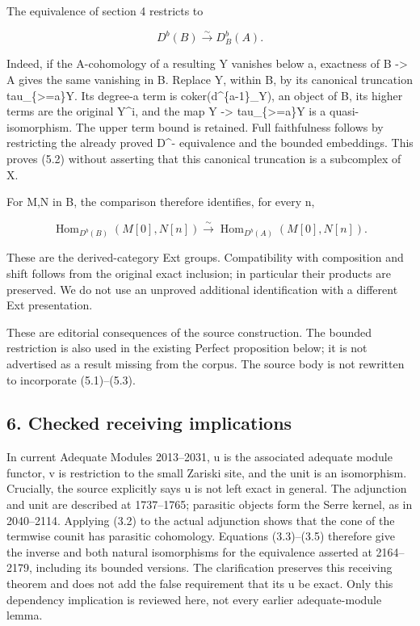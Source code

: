 \documentclass[11pt]{article}
\begin{document}
The equivalence of section 4 restricts to

\[
 D^b(B)\xrightarrow{\sim}D^b_B(A).                      \tag{5.2}
\]

Indeed,\allowbreak{} if the A-cohomology of a resulting Y vanishes below a,\allowbreak{} exactness of B \allowbreak{}-> A gives the same vanishing in B. Replace Y,\allowbreak{} within B,\allowbreak{} by its canonical truncation tau\_\allowbreak{}\{>\allowbreak{}=a\}Y. Its degree-a term is coker(d\textasciicircum{}\{a-1\}\_\allowbreak{}Y)\allowbreak{},\allowbreak{} an object of B,\allowbreak{} its higher terms are the original Y\textasciicircum{}i,\allowbreak{} and the map Y \allowbreak{}-> tau\_\allowbreak{}\{>\allowbreak{}=a\}Y is a quasi-isomorphism. The upper term bound is retained. Full faithfulness follows by restricting the already proved D\^{}- equivalence and the bounded embeddings. This proves (5.2)\allowbreak{} without asserting that this canonical truncation is a subcomplex of X.

For M,\allowbreak{}N in B,\allowbreak{} the comparison therefore identifies,\allowbreak{} for every n,\allowbreak{}

\[
 \operatorname{Hom}_{D^b(B)}(M[0],N[n])
   \xrightarrow{\sim}
 \operatorname{Hom}_{D^b(A)}(M[0],N[n]).                 \tag{5.3}
\]

These are the derived-category Ext groups. Compatibility with composition and shift follows from the original exact inclusion; in particular their products are preserved. We do not use an unproved additional identification with a different Ext presentation.

These are editorial consequences of the source construction. The bounded restriction is also used in the existing Perfect proposition below; it is not advertised as a result missing from the corpus. The source body is not rewritten to incorporate (5.1)\allowbreak{}–\allowbreak{}(5.3)\allowbreak{}.

\subsection{6. Checked receiving implications}\label{proofs-5910-6199-checked-receiving-implications}

In current Adequate Modules 2013–\allowbreak{}2031,\allowbreak{} u is the associated adequate module functor,\allowbreak{} v is restriction to the small Zariski site,\allowbreak{} and the unit is an isomorphism. Crucially,\allowbreak{} the source explicitly says u is not left exact in general. The adjunction and unit are described at 1737–\allowbreak{}1765; parasitic objects form the Serre kernel,\allowbreak{} as in 2040–\allowbreak{}2114. Applying (3.2)\allowbreak{} to the actual adjunction shows that the cone of the termwise counit has parasitic cohomology. Equations (3.3)\allowbreak{}–\allowbreak{}(3.5)\allowbreak{} therefore give the inverse and both natural isomorphisms for the equivalence asserted at 2164–\allowbreak{}2179,\allowbreak{} including its bounded versions. The clarification preserves this receiving theorem and does not add the false requirement that its u be exact. Only this dependency implication is reviewed here,\allowbreak{} not every earlier adequate-module lemma.
\end{document}
